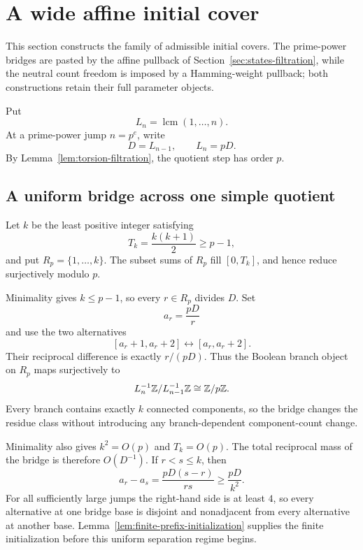 \section{A wide affine initial cover}
\label{sec:wide-start}

This section constructs the family of admissible initial covers.  The prime-power bridges are pasted by the affine pullback of Section~\ref{sec:states-filtration}, while the neutral count freedom is imposed by a Hamming-weight pullback; both constructions retain their full parameter objects.

Put
\[
L_n=\operatorname{lcm}(1,\ldots,n).
\]
At a prime-power jump $n=p^e$, write
\[
D=L_{n-1},
\qquad
L_n=pD.
\]
By Lemma~\ref{lem:torsion-filtration}, the quotient step has order $p$.

\subsection{A uniform bridge across one simple quotient}

Let $k$ be the least positive integer satisfying
\[
T_k=\frac{k(k+1)}2\ge p-1,
\]
and put $R_p=\{1,\ldots,k\}$.  The subset sums of $R_p$ fill $[0,T_k]$, and hence reduce surjectively modulo $p$.

Minimality gives $k\le p-1$, so every $r\in R_p$ divides $D$.  Set
\[
a_r=\frac{pD}{r}
\]
and use the two alternatives
\begin{equation}\label{eq:bridge-switch}
[a_r+1,a_r+2]
\longleftrightarrow
[a_r,a_r+2].
\end{equation}
Their reciprocal difference is exactly $r/(pD)$.  Thus the Boolean branch object on $R_p$ maps surjectively to
\[
L_n^{-1}\mathbb Z/L_{n-1}^{-1}\mathbb Z
\cong\mathbb Z/p\mathbb Z.
\]
Every branch contains exactly $k$ connected components, so the bridge changes the residue class without introducing any branch-dependent component-count change.

Minimality also gives $k^2=O(p)$ and $T_k=O(p)$.  The total reciprocal mass of the bridge is therefore $O(D^{-1})$.  If $r<s\le k$, then
\begin{equation}\label{eq:bridge-separation}
a_r-a_s
=\frac{pD(s-r)}{rs}
\ge\frac{pD}{k^2}.
\end{equation}
For all sufficiently large jumps the right-hand side is at least $4$, so every alternative at one bridge base is disjoint and nonadjacent from every alternative at another base.  Lemma~\ref{lem:finite-prefix-initialization} supplies the finite initialization before this uniform separation regime begins.

